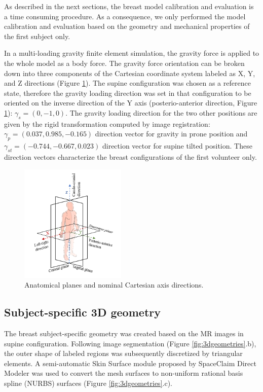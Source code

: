 As described in the next sections, the breast model calibration and evaluation is a time consuming procedure. As a consequence, we only performed the model calibration and evaluation based on the geometry and mechanical properties of the first subject only. 

In a multi-loading gravity finite element simulation, the gravity force is applied to the whole model as a body force. The gravity force orientation can be broken down into three components of the Cartesian coordinate system labeled as X, Y, and Z directions (Figure \ref{fig:xyz_axis_directions}). The supine configuration was chosen as a reference state, therefore the gravity loading direction was set in that configuration to be oriented on the inverse direction of the Y axis (posterio-anterior direction, Figure \ref{fig:xyz_axis_directions}): $\gamma_s = (0,-1,0)$.   The gravity loading direction for the two other positions are given by the rigid transformation computed by image registration: $\gamma_p = (0.037, 0.985, -0.165)$ direction vector for gravity in prone position and $\gamma_{st} = (-0.744 , -0.667, 0.023)$ direction vector for supine tilted position. These direction vectors characterize the breast configurations of the first volunteer only.

\begin{figure}[!ht]
\centering
\includegraphics[width=0.45\textwidth,keepaspectratio]{figures/xyz_axis_directions.png} 
\caption{Anatomical planes and nominal Cartesian axis directions.}\label{fig:xyz_axis_directions}
\end{figure}

\subsection{Subject-specific 3D geometry}\label{subsection:patientspecificgeometry}

The breast subject-specific geometry was created based on the MR images in supine configuration. Following image segmentation (Figure \ref{fig:3dgeometries}.b), the outer shape of labeled regions was subsequently discretized by triangular elements.  A semi-automatic Skin Surface module proposed by SpaceClaim Direct Modeler was used to convert the mesh surfaces to non-uniform rational basis spline (NURBS) surfaces (Figure \ref{fig:3dgeometries}.c). 

